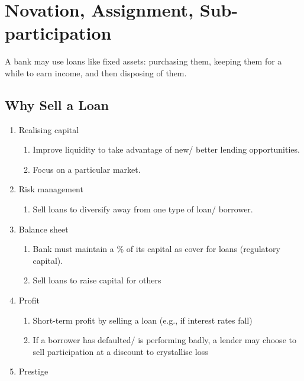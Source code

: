 \documentclass[
]{article}
\providecommand{\tightlist}{%
  \setlength{\itemsep}{0pt}\setlength{\parskip}{0pt}}
\begin{document}
\hypertarget{novation-assignment-sub-participation}{%
\section{Novation, Assignment,
Sub-participation}\label{novation-assignment-sub-participation}}

A bank may use loans like fixed assets: purchasing them, keeping them
for a while to earn income, and then disposing of them.

\hypertarget{why-sell-a-loan}{%
\subsection{Why Sell a Loan}\label{why-sell-a-loan}}

\begin{enumerate}
\tightlist
\item
  Realising capital

  \begin{enumerate}
  \tightlist
  \item
    Improve liquidity to take advantage of new/ better lending
    opportunities.
  \item
    Focus on a particular market.
  \end{enumerate}
\item
  Risk management

  \begin{enumerate}
  \tightlist
  \item
    Sell loans to diversify away from one type of loan/ borrower.
  \end{enumerate}
\item
  Balance sheet

  \begin{enumerate}
  \tightlist
  \item
    Bank must maintain a \% of its capital as cover for loans
    (regulatory capital).
  \item
    Sell loans to raise capital for others
  \end{enumerate}
\item
  Profit

  \begin{enumerate}
  \tightlist
  \item
    Short-term profit by selling a loan (e.g., if interest rates fall)
  \item
    If a borrower has defaulted/ is performing badly, a lender may
    choose to sell participation at a discount to crystallise loss
  \end{enumerate}
\item
  Prestige


\end{enumerate}
\end{document}
